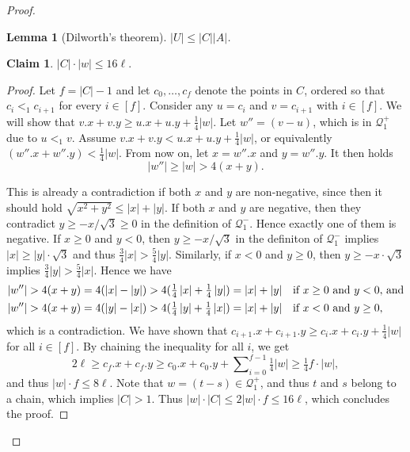 \documentclass[11pt, letterpaper]{article}
\theoremstyle{plain}
\newtheorem{lemma}{Lemma}
\theoremstyle{definition}
\newtheorem{claim}{Claim}
\theoremstyle{remark}
\newcommand{\Q}{\mathcal{Q}}
\newcommand{\absolute}[1]{\left\lvert#1\right\rvert}
\begin{document}
\begin{proof}
\begin{lemma}[Dilworth's theorem]\label{dilworth}
	$\absolute{U} \le \absolute{C} \absolute{A}$.
\end{lemma}

\begin{claim}\label{C_ineq}
	$\absolute{C} \cdot \absolute{w} \leq 16\ell$. 
	\begin{proof}
		Let $f = \absolute{C} - 1$ and
		let $c_0, \dots, c_{f}$ denote the points in $C$, ordered so that $c_i <_1 c_{i + 1}$ for every $i \in [f]$.
		Consider any $u = c_i$ and $v = c_{i + 1}$ with $i \in [f]$. We will show that $v.x + v.y \geq u.x + u.y + \frac14\absolute{w}$. 		
		Let $w'' = (v - u)$, which is in $\Q_1^+$ due to $u <_1 v$. Assume $v.x + v.y < u.x + u.y + \frac14\absolute{w}$, or equivalently $(w''.x + w''.y) < \frac14\absolute{w}$. From now on, let $x = w''.x$ and $y = w''.y$. It then holds $$\absolute{w''} \geq \absolute{w} > 4(x + y).$$
		
		This is already a contradiction if both $x$ and $y$ are non-negative, since then it should hold $\sqrt{x^2 + y^2} \leq \absolute{x} + \absolute{y}$. If both $x$ and $y$ are negative, then they contradict $y \geq -x/\sqrt{3} \geq 0$ in the definition of $\Q_1^-$. Hence exactly one of them is negative. If $x \geq 0$ and $y < 0$, then $y \geq -x / \sqrt{3}$ in the definiton of $\Q_1^-$ implies $\absolute{x} \geq \absolute{y}\cdot \sqrt{3}$ and thus $\frac34\absolute{x} > \frac54\absolute{y}$. Similarly, if $x < 0$ and $y \geq 0$, then $y \geq -x \cdot \sqrt{3}$ implies $\frac34\absolute{y} > \frac54\absolute{x}$. Hence we have
	\begin{alignat*}{1}	
		\absolute{w''} > 4(x + y) = 
		4(\absolute{x} - \absolute{y}) > 
		4(\tfrac14\absolute{x} + \tfrac14\absolute{y}) = 
		\absolute{x} + \absolute{y}&\text{\quad if $x \geq 0$ and $y < 0$, and}\\
		\absolute{w''} > 4(x + y) = 
		4(\absolute{y} - \absolute{x}) > 
		4(\tfrac14\absolute{y} + \tfrac14\absolute{x}) = 
		\absolute{x} + \absolute{y}&\text{\quad if $x < 0$ and $y \geq 0$,}
	\end{alignat*}
	which is a contradiction.
	We have shown that $c_{i + 1}.x + c_{i + 1}.y \geq c_i.x + c_i.y + \frac14\absolute{w}$ for all $i \in [f]$. By chaining the inequality for all $i$, we get $$2\ell \geq c_f.x + c_f.y \geq c_0.x + c_0.y + \sum\nolimits_{i = 0}^{f - 1} \tfrac14\absolute{w} \geq \tfrac14f\cdot{\absolute{w}},$$ and thus $\absolute{w} \cdot f \leq 8\ell$. Note that $w = (t - s) \in \Q_1^+$, and thus $t$ and $s$ belong to a chain, which implies $\absolute{C} > 1$. Thus $\absolute{w} \cdot \absolute{C} \leq 2\absolute{w} \cdot f \leq 16\ell$, which concludes the proof.
	\end{proof}%
\end{claim}


\end{proof}
\end{document}
